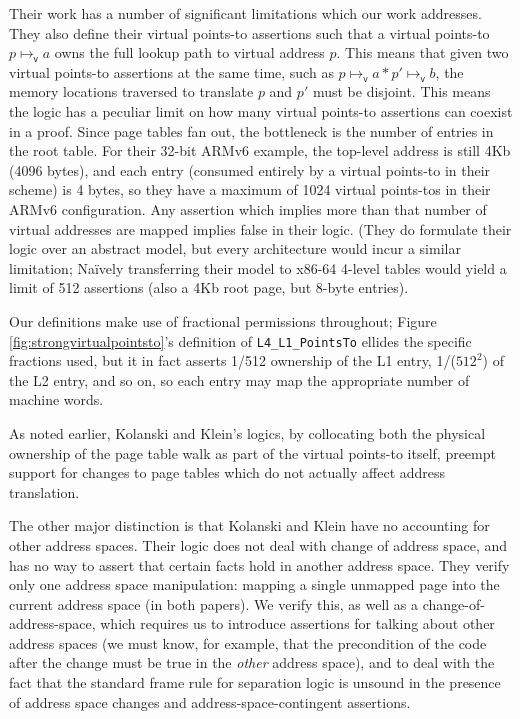 \documentclass[acmsmall,screen,nonacm]{acmart}
\begin{document}
Their work has a number of significant limitations which our work addresses.
They also define their virtual points-to assertions such that a virtual points-to $p\mapsto_\mathsf{v} a$ owns the full 
lookup path to virtual address $p$. This means that given two virtual points-to assertions at the same time, such as 
$p\mapsto_\mathsf{v}a \ast p'\mapsto_\mathsf{v}b$, the memory locations traversed to translate $p$ and $p'$ must be disjoint. 
This means the logic has a peculiar limit on how many virtual points-to assertions can coexist in a proof. Since page tables 
fan out, the bottleneck is the number of entries in the root table. For their 32-bit ARMv6 example, the top-level address is 
still 4Kb (4096 bytes), and each entry (consumed entirely by a virtual points-to in their scheme) is 4 bytes, so they have a 
maximum of 1024 virtual points-tos in their ARMv6 configuration. Any assertion which implies more than that number
of virtual addresses are mapped implies false in their logic.
(They do formulate their logic over an abstract model, but every architecture would incur a similar limitation;
Na\"ively transferring their model to x86-64 4-level tables would yield a limit of 512 assertions (also a 4Kb root page, 
but 8-byte entries).

%
%
%
%
%
%
Our definitions make use of fractional permissions throughout; Figure \ref{fig:strongvirtualpointsto}'s definition
of \lstinline|L4_L1_PointsTo| ellides the specific fractions used, but it in fact asserts 1/512 ownership of
the L1 entry, 1/($512^2$) of the L2 entry, and so on, so each entry may map the appropriate number of machine words.

As noted earlier, Kolanski and Klein's logics, by collocating both the physical ownership of the page table walk
as part of the virtual points-to itself, preempt support for changes to page tables which do not actually affect 
address translation.

The other major distinction is that Kolanski and Klein have no accounting for other address spaces.
Their logic does not deal with change of address space, and has no way to assert that certain facts hold
in another address space.
They verify only one address space manipulation: mapping a single unmapped page into the current address space (in both papers).
We verify this, as well as a change-of-address-space, which requires us to introduce assertions for talking
about other address spaces (we must know, for example, that the precondition of the code after the change must be true
in the \emph{other} address space), and to deal with the fact that the standard frame rule
for separation logic is unsound in the presence of address space changes and address-space-contingent assertions.
%
%
\end{document}
